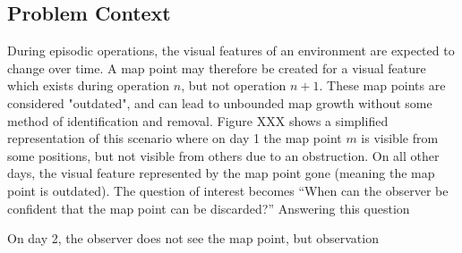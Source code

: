 \subsection{Problem Context}
During episodic operations, the visual features of an environment are expected to change over time. A map point may therefore be created for a visual feature which exists during operation $n$, but not operation $n + 1$. These map points are considered "outdated", and can lead to unbounded map growth without some method of identification and removal. Figure XXX shows a simplified representation of this scenario where on day 1 the map point $m$ is visible from some positions, but not visible from others due to an obstruction. On all other days, the visual feature represented by the map point gone (meaning the map point is outdated). The question of interest becomes ``When can the observer be confident that the map point can be discarded?'' Answering this question 

On day 2, the observer does not see the map point, but observation